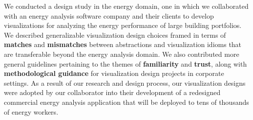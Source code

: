 \documentclass[journal]{vgtc}                %
\begin{document}

We conducted a design study in the energy domain, one in which we collaborated with an energy analysis software company and their clients to develop visualizations for analyzing the energy performance of large building portfolios.
We described generalizable visualization design choices framed in terms of {\bf matches} and {\bf mismatches} between abstractions and visualization idioms that are transferable beyond the energy analysis domain.
We also contributed more general guidelines pertaining to the themes of {\bf familiarity} and {\bf trust}, along with {\bf methodological guidance} for visualization design projects in corporate settings.
As a result of our research and design process, our visualization designs were adopted by our collaborator into their development of a redesigned commercial energy analysis application that will be deployed to tens of thousands of energy workers.





\end{document}

